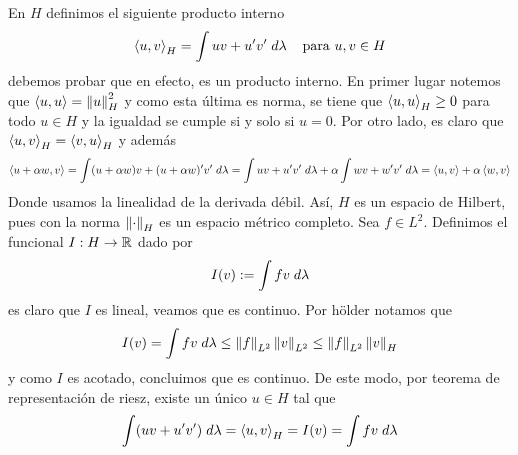 \documentclass{article}
\begin{document}
\begin{enumerate}
    En $H$ definimos el siguiente producto interno
    \begin{equation*}
        \left\langle{u},{v}\right\rangle_{H}=\int uv+u'v'\hspace{1mm}d\lambda
        \hspace{4mm}\text{para }u,v\in H
    \end{equation*}
    debemos probar que en efecto, es un producto interno. En primer lugar notemos que 
    $\left\langle{u},{u}\right\rangle=\left \lVert u\right \rVert_{H}^{2}$ y como esta última es norma, se tiene que $\left\langle{u},{u}\right\rangle_{H}\geq0$ 
    para todo $u\in H$ y la igualdad se cumple si y solo si $u=0$. Por otro lado, es claro que
    $\left\langle{u},{v}\right\rangle_{H}=\left\langle{v},{u}\right\rangle_{H}$ y además
    \begin{equation*}
        \left\langle{u+\alpha w},{v}\right\rangle=\int(u+\alpha w)v+(u+\alpha w)'v'\hspace{1mm}d\lambda
        =\int uv+u'v'\hspace{1mm}d\lambda+\alpha\int wv+w'v'\hspace{1mm}d\lambda
        =\left\langle{u},{v}\right\rangle+\alpha\left\langle{w},{v}\right\rangle
    \end{equation*}
    Donde usamos la linealidad de la derivada débil. Así, $H$ es un espacio de Hilbert, pues con 
    la norma $\left \lVert \cdot\right \rVert_{H}$ es un espacio métrico completo. Sea $f\in L^{2}$. Definimos el 
    funcional $I:H\to\mathbb{R}$ dado por
    \begin{equation*}
        I(v):=\int fv\hspace{1mm}d\lambda
    \end{equation*}
    es claro que $I$ es lineal, veamos que es continuo. Por hölder notamos que
    \begin{equation*}
        I(v)=\int fv\hspace{1mm}d\lambda\leq\left \lVert f\right \rVert_{L^{2}}\left \lVert v\right \rVert_{L^{2}}
        \leq\left \lVert f\right \rVert_{L^{2}}\left \lVert v\right \rVert_{H}
    \end{equation*}
    y como $I$ es acotado, concluimos que es continuo. De este modo, por teorema de representación
    de riesz, existe un único $u\in H$ tal que
    \begin{equation*}
        \int (uv+u'v')\hspace{1mm}d\lambda=\left\langle{u},{v}\right\rangle_{H}=I(v)=\int fv\hspace{1mm}d\lambda
    \end{equation*}
\end{enumerate}

\end{document}
